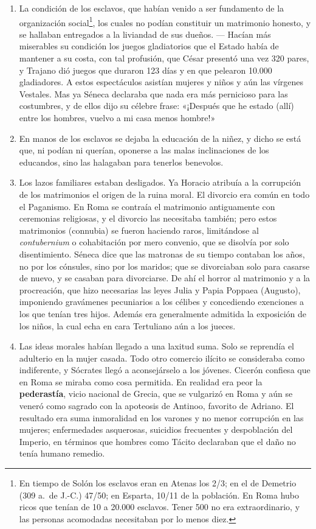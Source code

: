 \raggedbottom{} \documentclass[12pt, a4paper, openany]{book} %
\begin{document}
\begin{enumerate}
\begin{enumerate}
          \item La condición de los esclavos, que habían venido a ser fundamento de la organización social\textdagger\footnote{En tiempo de Solón los esclavos eran en Atenas los 2/3; en el de Demetrio (309 a.\ de J.-C.) 47/50; en Esparta, 10/11 de la población. En Roma hubo ricos que tenían de 10 a 20.000 esclavos. Tener 500 no era extraordinario, y las personas acomodadas necesitaban por lo menos diez.}, los cuales no podían constituir un matrimonio honesto, y se hallaban entregados a la liviandad de sus dueños. --- Hacían más miserables su condición los juegos gladiatorios que el Estado había de mantener a su costa, con tal profusión, que César presentó una vez 320 pares, y Trajano dió juegos que duraron 123 días y en que pelearon 10.000 gladiadores. A estos espectáculos asistían mujeres y niños y aún las vírgenes Vestales. Mas ya Séneca declaraba que nada era más pernicioso para las costumbres, y de ellos dijo su célebre frase: «¡Después que he estado (allí) entre los hombres, vuelvo a mi casa menos hombre!»
          \item En manos de los esclavos se dejaba la educación de la niñez, y dicho se está que, ni podían ni querían, oponerse a las malas inclinaciones de los educandos, sino las halagaban para tenerlos benevolos.
          \item Los lazos familiares estaban desligados. Ya Horacio atribuía a la corrupción de los matrimonios el origen de la ruina moral. El divorcio era común en todo el Paganismo. En Roma se contraía el matrimonio antiguamente con ceremonias religiosas, y el divorcio las necesitaba también; pero estos matrimonios (connubia) se fueron haciendo raros, limitándose al \textit{contubernium} o cohabitación por mero convenio, que se disolvía por solo disentimiento. Séneca dice que las matronas de su tiempo contaban los años, no por los cónsules, sino por los maridos; que se divorciaban solo para casarse de nuevo, y se casaban para divorciarse. De ahí el horror al matrimonio y a la procreación, que hizo necesarias las leyes Julia y Papia Poppaea (Augusto), imponiendo gravámenes pecuniarios a los célibes y concediendo exenciones a los que tenían tres hijos. Además era generalmente admitida la exposición de los niños, la cual echa en cara Tertuliano aún a los jueces.
          \item Las ideas morales habían llegado a una laxitud suma. Solo se reprendía el adulterio en la mujer casada. Todo otro comercio ilícito se consideraba como indiferente, y Sócrates llegó a aconsejárselo a los jóvenes. Cicerón confiesa que en Roma se miraba como cosa permitida. En realidad era peor la \textbf{pederastía}, vicio nacional de Grecia, que se vulgarizó en Roma y aún se veneró como sagrado con la apoteosis de Antinoo, favorito de Adriano. El resultado era suma inmoralidad en los varones y no menor corrupción en las mujeres; enfermedades asquerosas, suicidios frecuentes y despoblación del Imperio, en términos que hombres como Tácito declaraban que el daño no tenía humano remedio.

\end{enumerate}
\end{enumerate}
\end{document}

